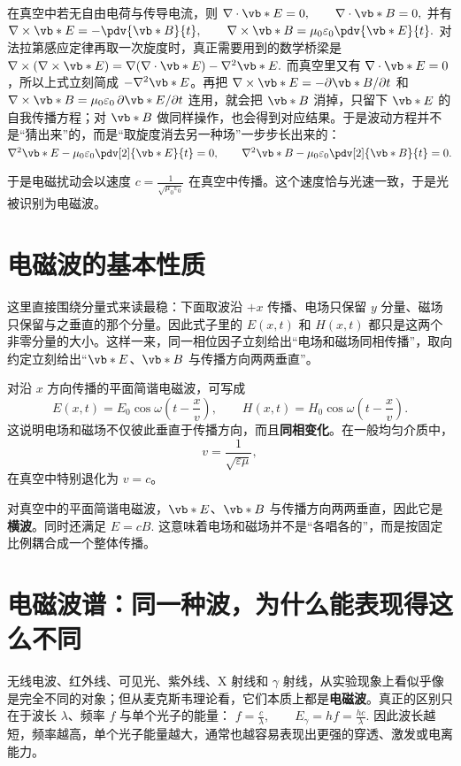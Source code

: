 \documentclass[lang=cn,11pt]{elegantbook}
\newcommand{\bridge}[1]{\begin{note}#1\end{note}}
\begin{document}
在真空中若无自由电荷与传导电流，则
 \(\nabla\cdot \vb*{E}=0,\qquad \nabla\cdot \vb*{B}=0,\) 
并有
 \(\nabla\times \vb*{E}=-\pdv{\vb*{B}}{t}, \qquad \nabla\times \vb*{B}=\mu_0\varepsilon_0\pdv{\vb*{E}}{t}.\) 
对法拉第感应定律再取一次旋度时，真正需要用到的数学桥梁是
 \(\nabla\times(\nabla\times \vb*{E}) =\nabla(\nabla\cdot \vb*{E})-\nabla^2\vb*{E}.\) 
而真空里又有 \(\nabla\cdot \vb*{E}=0\)，所以上式立刻简成 \(-\nabla^2\vb*{E}\)。再把 \(\nabla\times\vb*{E}=-\partial \vb*{B}/\partial t\) 和 \(\nabla\times\vb*{B}=\mu_0\varepsilon_0\,\partial \vb*{E}/\partial t\) 连用，就会把 \(\vb*{B}\) 消掉，只留下 \(\vb*{E}\) 的自我传播方程；对 \(\vb*{B}\) 做同样操作，也会得到对应结果。于是波动方程并不是“猜出来”的，而是“取旋度消去另一种场”一步步长出来的：
 \(\nabla^2 \vb*{E}-\mu_0\varepsilon_0\pdv[2]{\vb*{E}}{t}=0, \qquad \nabla^2 \vb*{B}-\mu_0\varepsilon_0\pdv[2]{\vb*{B}}{t}=0.\) 

于是电磁扰动会以速度
 \(c=\frac{1}{\sqrt{\mu_0\varepsilon_0}}\) 
在真空中传播。这个速度恰与光速一致，于是光被识别为电磁波。

\section{电磁波的基本性质}

\bridge{这里直接围绕分量式来读最稳：下面取波沿 \(+x\) 传播、电场只保留 \(y\) 分量、磁场只保留与之垂直的那个分量。因此式子里的 \(E(x,t)\) 和 \(H(x,t)\) 都只是这两个非零分量的大小。这样一来，同一相位因子立刻给出“电场和磁场同相传播”，取向约定立刻给出“\(\vb*{E}\)、\(\vb*{B}\) 与传播方向两两垂直”。}

对沿 \(x\) 方向传播的平面简谐电磁波，可写成
\[
E(x,t)=E_0\cos\omega\left(t-\frac{x}{v}\right),
\qquad
H(x,t)=H_0\cos\omega\left(t-\frac{x}{v}\right).
\]
这说明电场和磁场不仅彼此垂直于传播方向，而且\textbf{同相变化}。在一般均匀介质中，
\[
v=\frac{1}{\sqrt{\varepsilon\mu}},
\]
在真空中特别退化为 \(v=c\)。

对真空中的平面简谐电磁波，\(\vb*{E}\)、\(\vb*{B}\) 与传播方向两两垂直，因此它是\textbf{横波}。同时还满足
 \(E=cB.\) 
这意味着电场和磁场并不是“各唱各的”，而是按固定比例耦合成一个整体传播。

\section{电磁波谱：同一种波，为什么能表现得这么不同}

无线电波、红外线、可见光、紫外线、X 射线和 \(\gamma\) 射线，从实验现象上看似乎像是完全不同的对象；但从麦克斯韦理论看，它们本质上都是\textbf{电磁波}。真正的区别只在于波长 \(\lambda\)、频率 \(f\) 与单个光子的能量：
 \(f=\frac{c}{\lambda}, \qquad E_\gamma=hf=\frac{hc}{\lambda}.\) 
因此波长越短，频率越高，单个光子能量越大，通常也越容易表现出更强的穿透、激发或电离能力。
\end{document}
